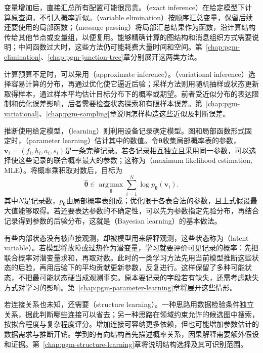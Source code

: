 变量增加后，直接汇总所有配置可能很昂贵。（exact inference）在给定模型下计算原查询，不引入概率近似。（variable elimination）按顺序汇总变量，保留后续还要使用的局部函数；（message passing）将局部汇总结果作为函数，沿计算结构传给其他节点或变量组，以便复用。能够精确计算的图结构和消息组织方式需要说明；中间函数过大时，这些方法仍可能耗费大量时间和空间。第~\ref{chap:pgm-elimination}、\ref{chap:pgm-junction-tree}章分别展开这两类方法。

计算预算不足时，可以采用（approximate inference）。（variational inference）选择容易计算的分布，再通过优化使它逼近后验；采样方法则用随机抽样或状态更新取得样本，通过样本平均估计目标分布下的概率或期望。前者受近似分布的表达限制和优化误差影响，后者需要检查状态探索和有限样本误差。第~\ref{chap:pgm-variational}、\ref{chap:pgm-sampling}章说明怎样构造这些近似及判断误差。

推断使用给定模型，（learning）则利用设备记录确定模型。图和局部函数形式固定时，（parameter learning）估计其中的数值。令$\bm\theta$收集局部概率表的参数，$\bm v_i=(f_i,h_i,a_i,s_i)$是一条完整记录。若各记录相互独立且采用同一参数，可以选择使这些记录的联合概率最大的参数；这称为（maximum likelihood estimation, MLE）。将概率乘积取对数后，目标为
\begin{equation}
  \widehat{\bm\theta}\in
  \operatorname*{arg\,max}_{\bm\theta}
  \sum_{i=1}^{N}\log p_{\bm\theta}(\bm v_i).
  \label{eq:pgm-overview-learning-goal}
\end{equation}
其中$N$是记录数，$p_{\bm\theta}$由局部概率表组成；优化限于各表合法的参数，且上式假设最大值能够取得。若还要表达参数的不确定性，可以先为参数指定先验分布，再结合记录得到参数的后验分布，这就是（Bayesian learning）的基本做法。

有些内部状态没有被直接观测，却被模型用来解释观测，这些状态称为（latent variable）。若模型将故障或过热作为潜变量，学习就要评价可见记录的概率：先把联合概率对潜变量求和，再取对数。此时的一类学习方法先用当前模型推断这些状态的后验，再用后验下的平均贡献更新参数，反复进行。这样保留了多种可能状态，不把最可能状态硬当成观测事实。原本要记录的字段若有缺失，还需考虑缺失方式对学习的影响。第~\ref{chap:pgm-parameter-learning}章将展开这些情形。

若连接关系也未知，还需要（structure learning）。一种思路用数据检验条件独立关系，据此判断哪些连接可以省去；另一种思路在领域约束允许的候选图中搜索，按拟合程度与复杂程度评分。增加连接可容纳更多依赖，但也可能增加参数估计的数据需求与推断开销。学到的有向结构首先描述概率关系，因果解释需要额外假设和证据。第~\ref{chap:pgm-structure-learning}章将说明结构选择及其可识别范围。

